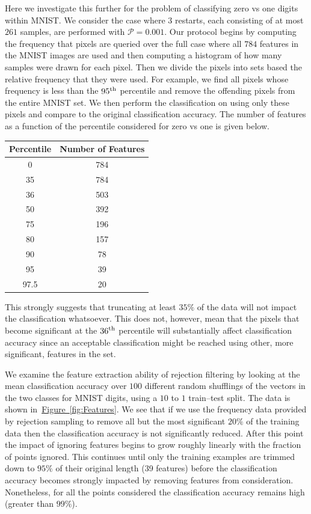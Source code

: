 \documentclass{article} %
\newcommand{\fig}[1]{\hyperref[fig:#1]{Figure~\ref*{fig:#1}}}
\begin{document}
Here we investigate this further for the problem of classifying zero vs one digits within MNIST.  We consider the case where $3$ restarts, each
consisting of at most $261$ samples, are performed with $\mathcal{P}=0.001$.  Our protocol begins by computing the frequency that pixels are queried over
the full case where all $784$ features in the MNIST images are used and then computing a histogram of how many samples were drawn for each pixel.  Then we divide the pixels
into sets based the relative frequency that they were used.  For example, we find all pixels whose frequency is less than the $95^{\rm th}$ percentile and remove the offending pixels from the entire MNIST set.  We then perform the classification on using only these pixels and compare to the original classification accuracy.  The number of features as a function of the percentile considered for zero vs one is given below.

\begin{table}[h!]
\centering
\begin{tabular}{|c|c|}
\hline
Percentile & Number of Features\\
\hline
0 & 784\\
35 &784\\
36 &503\\
50 &392\\
75&196\\
80&157\\
90&78\\
95&39\\
97.5&20\\
\hline
\end{tabular}
\end{table}

This strongly suggests that truncating at least $35\%$ of the data will not impact the classification whatsoever.  This does not, however, mean that the pixels that become significant at the $36^{\rm th}$ percentile will substantially affect classification accuracy since an acceptable classification might be reached using other, more significant, features in the set.  

We examine the feature extraction ability of rejection filtering by looking at the mean classification accuracy over $100$ different random shufflings of the vectors in the two classes for MNIST digits, using a $10$ to $1$ train--test split.  The data is shown in~\fig{Features}.  We see that if we use the frequency data provided by rejection sampling to remove all but the most significant $20\%$ of the training data then the classification accuracy is not significantly reduced.  After this point the impact of ignoring features begins to grow roughly linearly with the fraction of points ignored.  This continues until only the training examples are trimmed down to $95\%$ of their original length (39 features) before the classification accuracy becomes strongly impacted by removing features from consideration.  Nonetheless, for all the points considered the classification accuracy remains high (greater than $99\%$).
\end{document}

